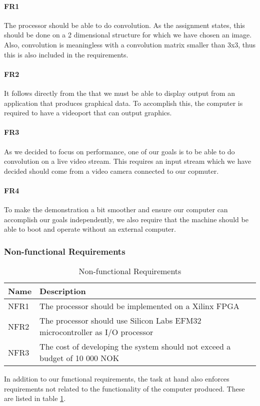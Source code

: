 \paragraph{FR1}
The processor should be able to do convolution.
As the assignment states, this should be done on a 2 dimensional structure for which we have chosen an image.
Also, convolution is meaningless with a convolution matrix smaller than 3x3, thus this is also included in the requirements.

\paragraph{FR2}
It follows directly from the  that we must be able to display output from an application that produces graphical data.
To accomplish this, the computer is required to have a videoport that can output graphics.

\paragraph{FR3}
As we decided to focus on performance, one of our goals is to be able to do convolution on a live video stream.
This requires an input stream which we have decided should come from a video camera connected to our copmuter.

\paragraph{FR4}
To make the demonstration a bit smoother and ensure our computer can accomplish our goals independently, we also require that the machine should be able to boot and operate without an external computer.


\subsubsection{Non-functional Requirements}

\begin{table}[h]
    \centering
    \label{tab:non-functional-requirements}
    \begin{tabular}{lp{12cm}l}
        Name & Description \\
        \hline
        NFR1 &
            The processor should be implemented on a Xilinx FPGA \\
        NFR2 &
            The processor should use Silicon Labs EFM32 microcontroller as I/O processor \\
        NFR3 &
            The cost of developing the system should not exceed a budget of 10 000 NOK \\
    \end{tabular}
    \caption{Non-functional Requirements}
\end{table}

In addition to our functional requirements, the task at hand also enforces requirements not related to the functionality of the computer produced. These are listed in table \ref{tab:non-functional-requirements}.

